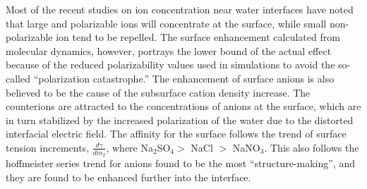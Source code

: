 Most of the recent studies on ion concentration near water interfaces have noted that large and polarizable ions will concentrate at the surface,\cite{Petersen2005b,Pegram2006,Sloutskin2007,Eggimann2008} while small non-polarizable ion tend to be repelled. The surface enhancement calculated from molecular dynamics, however, portrays the lower bound of the actual effect because of the reduced polarizability values used in simulations to avoid the so-called ``polarization catastrophe.'' The enhancement of surface anions is also believed to be the cause of the subsurface cation density increase. The counterions are attracted to the concentrations of anions at the surface, which are in turn stabilized by the increased polarization of the water due to the distorted interfacial electric field. The affinity for the surface follows the trend of surface tension increments, $\frac{d\gamma}{dm_2}$, where Na$_2$SO$_4 >$ NaCl $>$ NaNO$_3$.\cite{Pegram2006} This also follows the hoffmeister series trend for anions found to be the most ``structure-making'', and they are found to be enhanced further into the interface.
